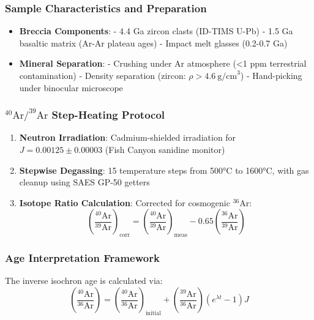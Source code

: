 \documentclass{article}
\begin{document}
\subsubsection*{Sample Characteristics and Preparation}
\begin{itemize}
    \item \textbf{Breccia Components}:  
    - 4.4 Ga zircon clasts (ID-TIMS U-Pb) \cite{Humayun2013}  
    - 1.5 Ga basaltic matrix (Ar-Ar plateau ages)  
    - Impact melt glasses (0.2-0.7 Ga)
    
    \item \textbf{Mineral Separation}:  
    - Crushing under Ar atmosphere (<1 ppm terrestrial contamination)  
    - Density separation (zircon: \(\rho > 4.6\ \text{g/cm}^3\))  
    - Hand-picking under binocular microscope
\end{itemize}

\subsubsection*{\(^{40}\text{Ar}/^{39}\text{Ar}\) Step-Heating Protocol}
\begin{enumerate}
    \item \textbf{Neutron Irradiation}:  
    Cadmium-shielded irradiation for \(J = 0.00125 \pm 0.00003\) (Fish Canyon sanidine monitor)
    
    \item \textbf{Stepwise Degassing}:  
    15 temperature steps from 500°C to 1600°C, with gas cleanup using SAES GP-50 getters
    
    \item \textbf{Isotope Ratio Calculation}:  
    Corrected for cosmogenic \(^{36}\text{Ar}\):
    \begin{equation}
        \left(\frac{{}^{40}\text{Ar}}{{}^{39}\text{Ar}}\right)_{\text{corr}} = \left(\frac{{}^{40}\text{Ar}}{{}^{39}\text{Ar}}\right)_{\text{meas}} - 0.65\left(\frac{{}^{36}\text{Ar}}{{}^{39}\text{Ar}}\right)
        \label{eq:cosmo_corr}
    \end{equation}
\end{enumerate}

\subsubsection*{Age Interpretation Framework}
The inverse isochron age is calculated via:
\begin{equation}
    \left(\frac{{}^{40}\text{Ar}}{{}^{36}\text{Ar}}\right) = \left(\frac{{}^{40}\text{Ar}}{{}^{36}\text{Ar}}\right)_{\text{initial}} + \left(\frac{{}^{39}\text{Ar}}{{}^{36}\text{Ar}}\right)\left(e^{\lambda t} - 1\right)J
    \label{eq:inverse_isochron}
\end{equation}
\end{document}
